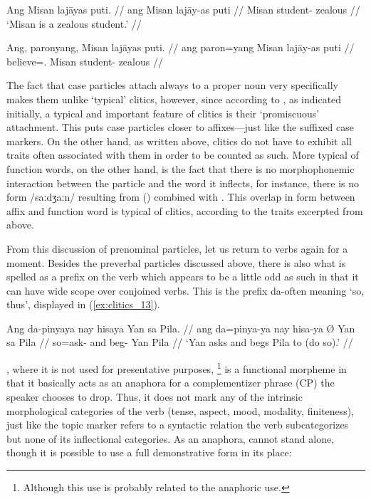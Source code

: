 \pex\label{ex:clitics_11}
\a\label{ex:clitics_11a}\begingl
	\gla Ang Misan lajāyas puti. //
	\glb ang Misan lajāy-as puti //
	\glc \Aarg{} Misan student-\Parg{} zealous //
	\glft `Misan is a zealous student.' //
\endgl

\a\label{ex:clitics_11b}\ljudge{*}\begingl
	\gla Ang, paronyang, Misan lajāyas puti. //
	\glb ang paron=yang Misan lajāy-as puti //
	\glc \Aarg{} believe=\Fsg{}.\Aarg{} Misan student-\Parg{} zealous //
\endgl
\xe

The fact that case particles attach always to a proper noun very specifically
makes them unlike `typical' clitics, however, since according to
\citet{spencerluis2012}, as indicated initially, a typical and important
feature of clitics is their `promiscuous' attachment. This puts case particles
closer to affixes—just like the suffixed case markers. On the other hand, as
written above, clitics do not have to exhibit all traits often associated with
them in order to be counted as such. More typical of function words, on the
other hand, is the fact that there is no morphophonemic interaction between the
particle and the word it inflects, for instance, there is no form /saːdʒaːn/
resulting from  (\Parg{}) combined with . This
overlap in form between affix and function word is typical of clitics,
according to the traits excerpted from \citet{spencerluis2012} above.

From this discussion of prenominal particles, let us return to verbs again for
a moment. Besides the preverbal particles discussed above, there is also what
is spelled as a prefix on the verb which appears to be a little odd as such in
that it can have wide scope over conjoined verbs. This is the prefix 
{da-}often meaning `so, thus', displayed in (\ref{ex:clitics_13}).

\ex\label{ex:clitics_13}\begingl
	\gla Ang da-pinyaya nay hisaya {} Yan sa Pila. //
	\glb ang da=pinya-ya nay hisa-ya Ø Yan sa Pila //
	\glc \AgtT{} so=ask-\TsgM{} and beg-\TsgM{} \Top{} Yan \Parg{} Pila //
	\glft `Yan asks and begs Pila to (do so).' //
\endgl\xe

, where it is not used for presentative purposes,
\footnote{Although this use is probably related to the anaphoric use.} is a
functional morpheme in that it basically acts as an anaphora for a
complementizer phrase (CP) the speaker chooses to drop. Thus, it does not mark
any of the intrinsic morphological categories of the verb (tense, aspect, mood,
modality, finiteness), just like the topic marker refers to a syntactic
relation the verb subcategorizes but none of its inflectional categories. As an
anaphora,  cannot stand alone, though it is possible to use a
full demonstrative form  in its place:

